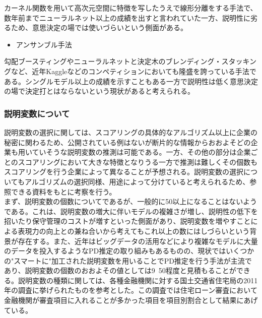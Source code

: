 \documentclass[11pt]{jsarticle}
\providecommand{\tightlist}{%
      \setlength{\itemsep}{0pt}\setlength{\parskip}{0pt}}
\begin{document}
カーネル関数を用いて高次元空間に特徴を写したうえで線形分離をする手法で、数年前までニューラルネット以上の成績を出すと言われていた一方、説明性に劣るため、意思決定の場では使いづらいという側面がある。

\begin{itemize}
\tightlist
\item
  アンサンブル手法
\end{itemize}

勾配ブースティングやニューラルネットと決定木のブレンディング・スタッキングなど、近年Kaggleなどのコンペティションにおいても隆盛を誇っている手法である。シングルモデル以上の成績を示すこともある一方で説明性は低く意思決定の場で決定打とはならないという現状があると考えられる。

    \subsubsection{説明変数について}\label{ux8aacux660eux5909ux6570ux306bux3064ux3044ux3066}
説明変数の選択に関しては、スコアリングの具体的なアルゴリズム以上に企業の秘密に関わるため、公開されている例はないが断片的な情報からおおよそどの企業も用いていそうな説明変数の推測は可能である。一方、その他の部分は企業ごとのスコアリングにおいて大きな特徴となりうる一方で推測は難しくその個数もスコアリングを行う企業によって異なることが予想される。説明変数の選択についてもアルゴリズムの選択同様、用途によって分けていると考えられるため、参照できる資料をもとに考察を行う。\\

まず、説明変数の個数についてであるが、一般的に50以上になることはないようである\cite{kirill}\cite{perspective}。これは、説明変数の増大に伴いモデルの複雑さが増し、説明性の低下を招いたり保守管理のコストが増すといった側面があり、説明変数を増やすことによる表現力の向上との兼ね合いから考えてもこれ以上の数にはしづらいという背景が存在する。また、近年はビッグデータの活用などにより複雑なモデルに大量のデータを投入するようなPD推定の取り組みもあるものの、現状ではいくつかの"スマートに"加工された説明変数を用いることでPD推定を行う手法が主流であり、説明変数の個数のおおよその値としては9~50程度と見積もることができる\cite{kirill}\cite{mlit}。説明変数の種類に関しては、各種金融機関に対する国土交通省住宅局の2011年の調査に挙げられたものを参考とした\cite{mlit}。この調査では住宅ローン審査において金融機関が審査項目に入れることが多かった項目を項目別割合として結果にあげている。
\end{document}
